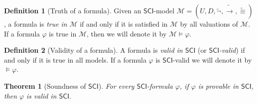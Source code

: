 \documentclass{article}
\newtheorem{theorem}{Theorem}
\theoremstyle{definition}
\newtheorem{definition}{Definition}[section]
\theoremstyle{definition}
\theoremstyle{definition}
\newcommand*{\id}{\equiv}
\newcommand*{\ra}{\rightarrow}
\newcommand{\SCI}{$\mathsf{SCI}$\xspace}
\begin{document}
\begin{definition}[Truth of a formula]
    Given an \SCI-model $\mathcal{M} = (U, D, \tilde{\lnot}, \tilde{\ra}, \tilde{\id})$, a formula is \emph{true in $\mathcal{M}$} if and only if it is satisfied in $\mathcal{M}$ by all valuations of $\mathcal{M}$. If a formula $\varphi$ is true in $\mathcal{M}$, then we will denote it by $\mathcal{M} \models \varphi$.
\end{definition}

\begin{definition}[Validity of a formula]
    A formula is \emph{valid in \SCI} (or \emph{\SCI-valid}) if and only if it is true in all models. If a formula $\varphi$ is \SCI-valid we will denote it by $ \models \varphi$.
\end{definition}

\begin{theorem}[Soundness of \SCI]
    For every \SCI-formula $\varphi$, if $\varphi$ is provable in \SCI, then $\varphi$ is valid in \SCI.
    \label{soundness}
\end{theorem}
\end{document}
